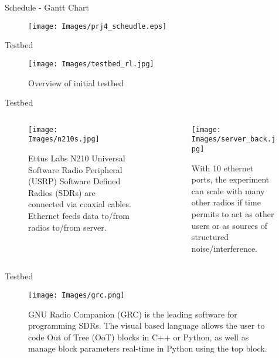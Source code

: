 \documentclass[pdf]{beamer}
\begin{document}
\begin{frame}[fragile]{Schedule - Gantt Chart}
\begin{figure}
\centering
\texttt{[image: Images/prj4\_scheudle.eps]}
\end{figure}
\end{frame}


\begin{frame}[fragile]{Testbed}
\begin{figure}
\centering
\texttt{[image: Images/testbed\_rl.jpg]}
\caption{Overview of initial testbed}
\end{figure}
\end{frame}




\begin{frame}[fragile]{Testbed}
\begin{columns}
\begin{column}{0.5\textwidth}
\begin{figure}
\centering
\texttt{[image: Images/n210s.jpg]}
\caption{Ettus Labs N210 Universal Software Radio Peripheral (USRP) Software Defined Radios (SDRs) are connected via coaxial cables. Ethernet feeds data to/from radios to/from server.}
\end{figure}
\end{column}

\begin{column}{0.5\textwidth}
\begin{figure}
\centering
\texttt{[image: Images/server\_back.jpg]}
\caption{With 10 ethernet ports, the experiment can scale with many other radios if time permits to act as other users or as sources of structured noise/interference.}
\end{figure}
\end{column}
\end{columns}
\end{frame}

\begin{frame}[fragile]{Testbed}
\begin{figure}
\centering
\texttt{[image: Images/grc.png]}
\caption{GNU Radio Companion (GRC) is the leading software for programming SDRs. The visual based language allows the user to code Out of Tree (OoT) blocks in C++ or Python, as well as manage block parameters real-time in Python using the top block.}
\end{figure}
\end{frame}
\end{document}
